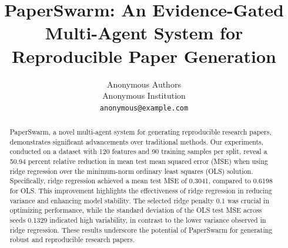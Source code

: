 \documentclass{article}
\title{PaperSwarm: An Evidence-Gated Multi-Agent System for Reproducible Paper Generation}
\author{Anonymous Authors \\
Anonymous Institution \\
\texttt{anonymous@example.com}}
\begin{document}
\maketitle

\begin{abstract}
PaperSwarm, a novel multi-agent system for generating reproducible research papers, demonstrates significant advancements over traditional methods. Our experiments, conducted on a dataset with 120 features and 90 training samples per split, reveal a 50.94 percent relative reduction in mean test mean squared error (MSE) when using ridge regression over the minimum-norm ordinary least squares (OLS) solution. Specifically, ridge regression achieved a mean test MSE of 0.3041, compared to 0.6198 for OLS. This improvement highlights the effectiveness of ridge regression in reducing variance and enhancing model stability. The selected ridge penalty 0.1 was crucial in optimizing performance, while the standard deviation of the OLS test MSE across seeds 0.1329 indicated high variability, in contrast to the lower variance observed in ridge regression. These results underscore the potential of PaperSwarm for generating robust and reproducible research papers.
\end{abstract}










\end{document}
